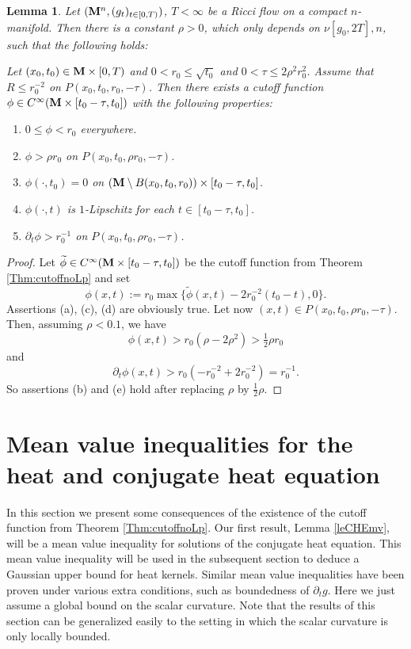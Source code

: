 \documentclass[11pt]{amsart}
\numberwithin{equation}{section}
\newtheorem{lemma}[theorem]{Lemma}
\def\M{{\bf M}}
\def\p{\partial}
\numberwithin{equation}{section}
\begin{document}
\begin{lemma} \label{Lem:secondcutoff} 
Let $(\M^n, (g_t)_{t \in [0,T)})$, $T < \infty$ be a Ricci flow on a compact $n$-manifold.
Then there is a constant $\rho > 0$, which only depends on $\nu[g_0, 2T], n$, such that the following holds:

Let $(x_0, t_0) \in \M \times [0,T)$ and $0 < r_0 \leq  \sqrt{t_0}$ and $0 < \tau \leq 2 \rho^2 r_0^2$.
Assume that $R \leq r_0^{-2}$ on $P(x_0, t_0, r_0, -\tau)$.
Then there exists a cutoff function $\phi \in C^{\infty}({\M} \times [t_0 - \tau, t_0])$
with the following properties:
\begin{enumerate}[label = (\alph*)]
\item $0 \le \phi < r_0$ everywhere.
\item $\phi > \rho r_0$ on $P(x_0, t_0, \rho r_0, -\tau)$.
\item $\phi (\cdot, t_0) = 0$ on $(\M \setminus B(x_0, t_0, r_0)) \times [t_0 - \tau, t_0]$.
\item $\phi (\cdot, t)$ is $1$-Lipschitz for each $t \in [t_0 - \tau, t_0]$.
\item $\p_t \phi > r^{-1}_0$ on $P(x_0, t_0, \rho r_0, -\tau)$.
\end{enumerate}
\end{lemma}

\begin{proof}
Let $\widetilde{\phi} \in C^\infty (\M \times [t_0 - \tau, t_0])$ be the cutoff function from Theorem \ref{Thm:cutoffnoLp} and set
\[ \phi (x,t) := r_0 \max \big\{  \widetilde{\phi} (x,t) - 2 r_0^{-2} (t_0 - t) , 0 \big\}. \]
Assertions (a), (c), (d) are obviously true.
Let now $(x,t) \in P(x_0, t_0, \rho r_0, - \tau)$.
Then, assuming $\rho < 0.1$, we have
\[ \phi (x,t) > r_0 ( \rho - 2\rho^2 ) > \tfrac12 \rho r_0 \]
and
\[ \partial_t \phi (x,t) > r_0 ( - r_0^{-2} + 2 r_0^{-2} ) = r_0^{-1}. \]
So assertions (b) and (e) hold after replacing $\rho$ by $\frac12 \rho$.
\end{proof}




\section{Mean value inequalities for the heat and conjugate heat equation} \label{sec:meanvalue}
In this section we present some consequences of the existence of the cutoff function from Theorem \ref{Thm:cutoffnoLp}.
Our first result, Lemma \ref{leCHEmv}, will be a mean value inequality for solutions of the conjugate heat equation. 
This mean value inequality will be used in the subsequent section to deduce a Gaussian upper bound for heat kernels.
Similar mean value inequalities have been proven under various extra conditions, such as boundedness
of $\partial_t g$.
Here we just assume a global bound on the scalar curvature.
Note that the results of this section can be generalized easily to the setting in which the scalar curvature is only locally bounded.
\end{document}
